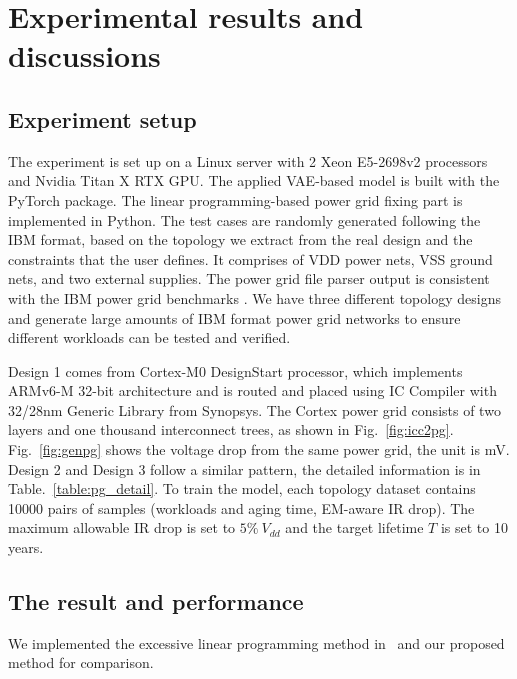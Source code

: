 \section{Experimental results and discussions}
\label{sec:results}
\subsection{Experiment setup}
The experiment is set up on a Linux server with 2 Xeon E5-2698v2 processors and Nvidia Titan X RTX GPU. 
The applied VAE-based model is built with the PyTorch package. 
The linear programming-based power grid fixing part is implemented in Python.
The test cases are randomly generated following the IBM format, based on the topology we extract from the real design and the constraints that the user defines.
It comprises of VDD power nets, VSS ground nets, and two external supplies.
The power grid file parser output is consistent with the IBM power grid benchmarks \cite{Nassif:ASPDAC'08}.
We have three different topology designs and generate large amounts of IBM format power grid networks to ensure different workloads can be tested and verified. 

Design 1 comes from Cortex-M0 DesignStart processor, which implements ARMv6-M 32-bit architecture and is routed and placed using IC Compiler with 32/28nm Generic Library from Synopsys. 
The Cortex power grid consists of two layers and one thousand interconnect trees, as shown in Fig.~\ref{fig:icc2pg}. Fig.~\ref{fig:genpg} shows the voltage drop from the same power grid, the unit is mV.
Design 2 and Design 3 follow a similar pattern, the detailed information is in Table.~\ref{table:pg_detail}.
To train the model, each topology dataset contains 10000 pairs of samples  (workloads and aging time, EM-aware IR drop). The maximum allowable IR drop is set to $5\% \ V_{dd}$ and the target lifetime $T$ is set to 10 years. 




\subsection{The result and performance}
We implemented the excessive linear programming method in~\cite{Sukharev:2019pg} and our proposed method for comparison. 

